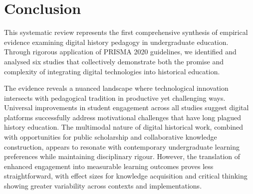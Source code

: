 \documentclass[
hf,
]{ceurart}
\begin{document}




\section{Conclusion}

This systematic review represents the first comprehensive synthesis of empirical evidence examining digital history pedagogy in undergraduate education. Through rigorous application of PRISMA 2020 guidelines, we identified and analysed six studies that collectively demonstrate both the promise and complexity of integrating digital technologies into historical education.

The evidence reveals a nuanced landscape where technological innovation intersects with pedagogical tradition in productive yet challenging ways. Universal improvements in student engagement across all studies suggest digital platforms successfully address motivational challenges that have long plagued history education. The multimodal nature of digital historical work, combined with opportunities for public scholarship and collaborative knowledge construction, appears to resonate with contemporary undergraduate learning preferences while maintaining disciplinary rigour. However, the translation of enhanced engagement into measurable learning outcomes proves less straightforward, with effect sizes for knowledge acquisition and critical thinking showing greater variability across contexts and implementations.
\end{document}
